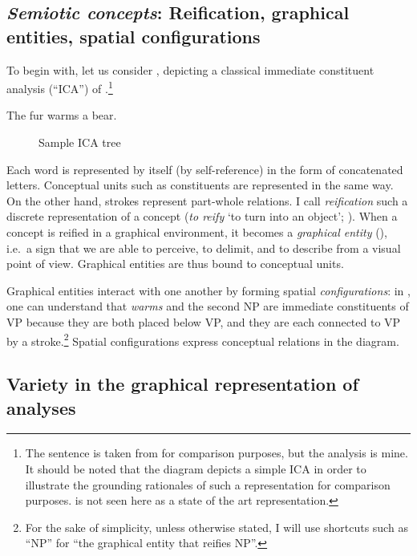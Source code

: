 \documentclass[output=paper]{langsci/langscibook}
\begin{document}
\subsection{\textit{Semiotic concepts}: Reification, graphical entities, spatial configurations}

To begin with, let us consider , depicting a classical immediate constituent analysis (“ICA”) of .\footnote{ \textrm{The sentence is taken from \citet[44]{clark_normal_1870} for comparison purposes, but the analysis is mine. It should be noted that the diagram depicts a simple ICA in order to illustrate the grounding rationales of such a representation for comparison purposes.  is not seen here as a state of the art representation.}} 

\ea \label{ex:4:1}%
The fur warms a bear.
\z

\begin{figure}
     \caption{Sample ICA tree\label{fig:4:1}}
\end{figure}

Each word is represented by itself (by self-reference) in the form of concatenated letters. Conceptual units such as constituents are represented in the same way. On the other hand, strokes represent part-whole relations. I call \textit{reification} such a discrete representation of a concept (\textit{to reify} ‘to turn into an object’; \citealt{kahane_syntactic_2015}). When a concept is reified in a graphical environment, it becomes a \textit{graphical entity} (\citealt{groupe__traite_1992}), i.e.~a sign that we are able to perceive, to delimit, and to describe from a visual point of view. Graphical entities are thus bound to conceptual units.

Graphical entities interact with one another by forming spatial \textit{configurations}: in , one can understand that \textit{warms} and the second NP are immediate constituents of VP because they are both placed below VP, and they are each connected to VP by a stroke.\footnote{For the sake of simplicity, unless otherwise stated, I will use shortcuts such as “NP” for “the graphical entity that reifies NP”.} Spatial configurations express conceptual relations in the diagram.

\subsection{Variety in the graphical representation of analyses}
\end{document}
